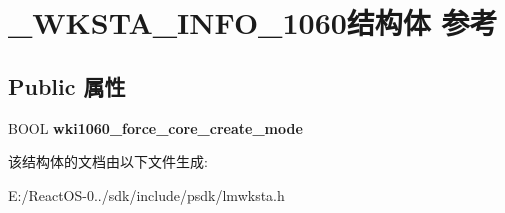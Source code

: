 \hypertarget{struct___w_k_s_t_a___i_n_f_o__1060}{}\section{\+\_\+\+W\+K\+S\+T\+A\+\_\+\+I\+N\+F\+O\+\_\+1060结构体 参考}
\label{struct___w_k_s_t_a___i_n_f_o__1060}
\subsection*{Public 属性}
\begin{DoxyCompactItemize}
\item 
\mbox{\label{struct___w_k_s_t_a___i_n_f_o__1060_ad943a7f6a84b08636e728c8dc9a55eab}} 
B\+O\+OL {\bfseries wki1060\+\_\+force\+\_\+core\+\_\+create\+\_\+mode}
\end{DoxyCompactItemize}


该结构体的文档由以下文件生成\+:\begin{DoxyCompactItemize}
\item 
E\+:/\+React\+O\+S-\/0../sdk/include/psdk/lmwksta.\+h\end{DoxyCompactItemize}
